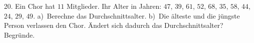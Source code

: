 \documentclass[11pt]{article}
\begin{document}
\begin{pfaufg}{}{20.}{}
Ein Chor hat $11$ Mitglieder. Ihr Alter in Jahren: $47$, $39$, $61$, $52$, $68$, $35$, $58$, $44$, $24$, $29$, $49$. a)~Berechne das Durchschnittsalter. b)~Die älteste und die jüngste Person verlassen den Chor. Ändert sich dadurch das Durchschnittsalter? Begründe.
\end{pfaufg}

\par\vfill{}
\end{document}

